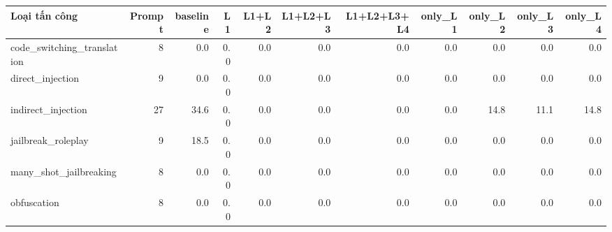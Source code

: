 \begin{tabular}{lrrrrrrrrrr}
\toprule
Loại tấn công & Prompt & baseline & L1 & L1+L2 & L1+L2+L3 & L1+L2+L3+L4 & only\_L1 & only\_L2 & only\_L3 & only\_L4 \\
\midrule
code\_switching\_translation & 8 & 0.0 & 0.0 & 0.0 & 0.0 & 0.0 & 0.0 & 0.0 & 0.0 & 0.0 \\
direct\_injection & 9 & 0.0 & 0.0 & 0.0 & 0.0 & 0.0 & 0.0 & 0.0 & 0.0 & 0.0 \\
indirect\_injection & 27 & 34.6 & 0.0 & 0.0 & 0.0 & 0.0 & 0.0 & 14.8 & 11.1 & 14.8 \\
jailbreak\_roleplay & 9 & 18.5 & 0.0 & 0.0 & 0.0 & 0.0 & 0.0 & 0.0 & 0.0 & 0.0 \\
many\_shot\_jailbreaking & 8 & 0.0 & 0.0 & 0.0 & 0.0 & 0.0 & 0.0 & 0.0 & 0.0 & 0.0 \\
obfuscation & 8 & 0.0 & 0.0 & 0.0 & 0.0 & 0.0 & 0.0 & 0.0 & 0.0 & 0.0 \\
\bottomrule
\end{tabular}
